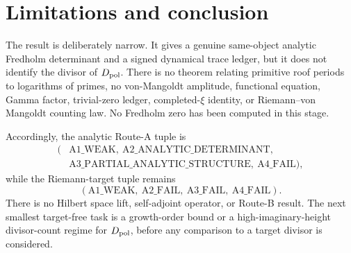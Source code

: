 \section{Limitations and conclusion}
The result is deliberately narrow. It gives a genuine same-object analytic
Fredholm determinant and a signed dynamical trace ledger, but it does not
identify the divisor of \(D_{\rm pol}\). There is no theorem relating
primitive roof periods to logarithms of primes, no von-Mangoldt amplitude,
functional equation, Gamma factor, trivial-zero ledger, completed-\(\xi\)
identity, or Riemann--von Mangoldt counting law. No Fredholm zero has been
computed in this stage.

Accordingly, the analytic Route-A tuple is
\[
\begin{aligned}
(&\mathrm{A1\_WEAK},\ \mathrm{A2\_ANALYTIC\_DETERMINANT},\\
 &\mathrm{A3\_PARTIAL\_ANALYTIC\_STRUCTURE},\ \mathrm{A4\_FAIL}),
\end{aligned}
\]
while the Riemann-target tuple remains
\[
(\mathrm{A1\_WEAK},\ \mathrm{A2\_FAIL},\
 \mathrm{A3\_FAIL},\ \mathrm{A4\_FAIL}).
\]
There is no Hilbert space lift, self-adjoint operator, or Route-B result.
The next smallest target-free task is a growth-order bound or a
high-imaginary-height divisor-count regime for \(D_{\rm pol}\), before any
comparison to a target divisor is considered.
